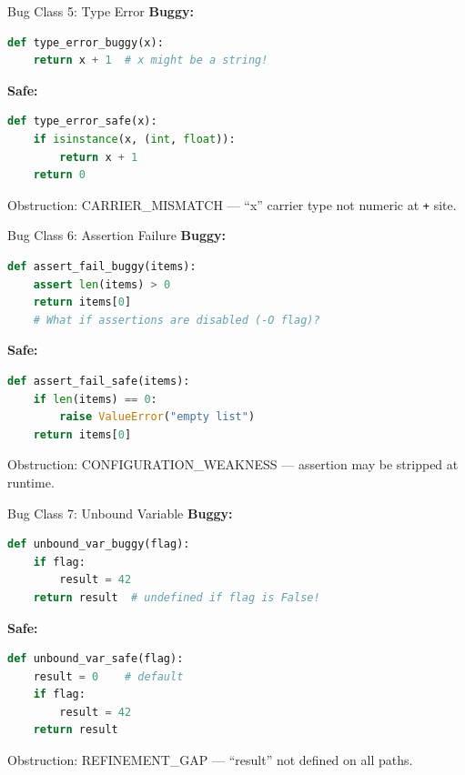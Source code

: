 \documentclass[aspectratio=169,10pt]{beamer}
\newcommand{\warn}[1]{\begin{center}
  \colorbox{warnbg}{\parbox{0.88\textwidth}{\centering\small #1}}\end{center}}
\begin{document}
\begin{frame}[fragile]{Bug Class 5: Type Error}
\textbf{Buggy:}
\begin{lstlisting}[language=Python, basicstyle=\ttfamily\scriptsize]
def type_error_buggy(x):
    return x + 1  # x might be a string!
\end{lstlisting}
\textbf{Safe:}
\begin{lstlisting}[language=Python, basicstyle=\ttfamily\scriptsize]
def type_error_safe(x):
    if isinstance(x, (int, float)):
        return x + 1
    return 0
\end{lstlisting}
\warn{Obstruction: CARRIER\_MISMATCH --- ``x'' carrier type not numeric at \texttt{+} site.}
\end{frame}

\begin{frame}[fragile]{Bug Class 6: Assertion Failure}
\textbf{Buggy:}
\begin{lstlisting}[language=Python, basicstyle=\ttfamily\scriptsize]
def assert_fail_buggy(items):
    assert len(items) > 0
    return items[0]
    # What if assertions are disabled (-O flag)?
\end{lstlisting}
\textbf{Safe:}
\begin{lstlisting}[language=Python, basicstyle=\ttfamily\scriptsize]
def assert_fail_safe(items):
    if len(items) == 0:
        raise ValueError("empty list")
    return items[0]
\end{lstlisting}
\warn{Obstruction: CONFIGURATION\_WEAKNESS --- assertion may be stripped at runtime.}
\end{frame}

\begin{frame}[fragile]{Bug Class 7: Unbound Variable}
\textbf{Buggy:}
\begin{lstlisting}[language=Python, basicstyle=\ttfamily\scriptsize]
def unbound_var_buggy(flag):
    if flag:
        result = 42
    return result  # undefined if flag is False!
\end{lstlisting}
\textbf{Safe:}
\begin{lstlisting}[language=Python, basicstyle=\ttfamily\scriptsize]
def unbound_var_safe(flag):
    result = 0    # default
    if flag:
        result = 42
    return result
\end{lstlisting}
\warn{Obstruction: REFINEMENT\_GAP --- ``result'' not defined on all paths.}
\end{frame}
\end{document}
